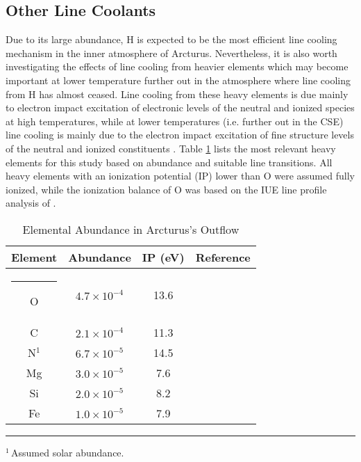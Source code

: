 \subsection{Other Line Coolants}\label{sec:3.4}
Due to its large abundance, H is expected to be the most efficient line cooling mechanism in the inner atmosphere of Arcturus. Nevertheless, it is also worth investigating the effects of line cooling from heavier elements which may become important at lower temperature further out in the atmosphere where line cooling from H has almost ceased. Line cooling from these heavy elements is due mainly to electron impact excitation of electronic levels of the neutral and ionized species at high temperatures, while at lower temperatures (i.e. further out in the CSE) line cooling is mainly due to the electron impact excitation of fine structure levels of the neutral and ionized constituents \citep{dalgarno_1972}. Table \ref{tab:7.1} lists the most relevant heavy elements for this study based on abundance and suitable line transitions. All heavy elements with an ionization potential (IP) lower than O were assumed fully ionized,  while the ionization balance of O was based on the IUE line profile analysis of \cite{judge_1986}.

\begin{table}[!ht]
\begin{center}
\caption[]{Elemental Abundance in Arcturus's Outflow}
\begin{tabular}{cccc}
\hline
\hline
\rule{0pt}{2.5ex} Element & Abundance & IP (eV) & Reference \\
\hline
\rule{-2.5pt}{2.5ex}	O &  $4.7\times 10^{-4}$ & 13.6 & \cite{ramirez_2011}\\
					C &  $2.1\times 10^{-4}$ & 11.3 & \cite{ramirez_2011}\\
					N$^{1}$ &  $6.7\times 10^{-5}$& 14.5 & \cite{asplund_2009}\\
					Mg & $3.0\times 10^{-5}$ & 7.6 & \cite{ramirez_2011}\\
					Si & $2.0\times 10^{-5}$ & 8.2 & \cite{ramirez_2011}\\
					Fe & $1.0\times 10^{-5}$ & 7.9 & \cite{decin_2003}\\
\hline
\end{tabular}
\label{tab:7.1}
\begin{minipage}{12.5cm}
\rule{-2.5pt}{2.5ex}{\footnotesize $^{1}$\,Assumed solar abundance.}
\end{minipage}
\end{center}
\end{table}

